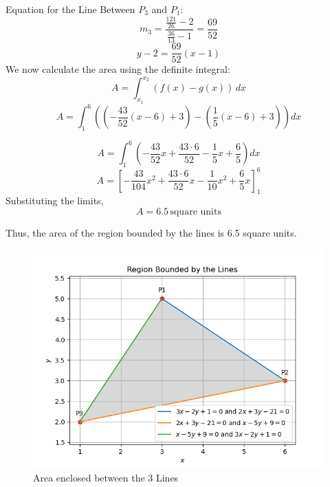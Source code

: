 \documentclass[journal]{IEEEtran}
\begin{document}
Equation for the Line Between $P_3$ and $P_1$:
\begin{equation}
m_3 = \frac{\frac{121}{26} - 2}{\frac{36}{13} - 1} = \frac{69}{52}
\end{equation}
\begin{equation}
y - 2 = \frac{69}{52}(x - 1)
\end{equation}
We now calculate the area using the definite integral:
\begin{equation}
A = \int_{x_1}^{x_2} \left( f(x) - g(x) \right) \, dx
\end{equation}
\begin{equation}
A = \int_{1}^{6} \left( \left( -\frac{43}{52}(x - 6) + 3 \right) - \left( \frac{1}{5}(x - 6) + 3 \right) \right) dx
\end{equation}

\begin{equation}
A = \int_{1}^{6} \left( -\frac{43}{52}x + \frac{43 \cdot 6}{52} - \frac{1}{5}x + \frac{6}{5} \right) dx
\end{equation}
\begin{equation}
A = \left[ -\frac{43}{104}x^2 + \frac{43 \cdot 6}{52}x - \frac{1}{10}x^2 + \frac{6}{5}x \right]_{1}^{6}
\end{equation}
Substituting the limits,
\begin{equation}
A = 6.5 \, \text{square units}
\end{equation}

Thus, the area of the region bounded by the lines is 6.5 square units.
\begin{figure}[h!]
	\centering
	\includegraphics[width=0.5\linewidth]{figs/Figure_1.png}
	\caption{Area enclosed between the 3 Lines}
	\label{stemplot}
\end{figure}	
\end{document}
